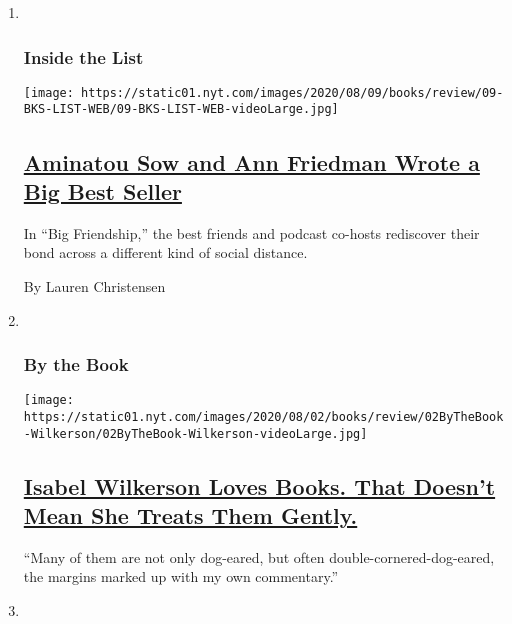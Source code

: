 \begin{enumerate}
\def\labelenumi{\arabic{enumi}.}
\item ~
  \hypertarget{inside-the-list}{%
  \subsubsection{Inside the List}\label{inside-the-list}}

  \texttt{[image: https://static01.nyt.com/images/2020/08/09/books/review/09-BKS-LIST-WEB/09-BKS-LIST-WEB-videoLarge.jpg]}

  \hypertarget{aminatou-sow-and-ann-friedman-wrote-a-big-best-seller}{%
  \subsection{\texorpdfstring{\href{/2020/07/30/books/review/aminatou-sow-ann-friedman-big-friendship.html}{Aminatou
  Sow and Ann Friedman Wrote a Big Best
  Seller}}{Aminatou Sow and Ann Friedman Wrote a Big Best Seller}}\label{aminatou-sow-and-ann-friedman-wrote-a-big-best-seller}}

  In ``Big Friendship,'' the best friends and podcast co-hosts
  rediscover their bond across a different kind of social distance.

  By Lauren Christensen
\item ~
  \hypertarget{by-the-book}{%
  \subsubsection{By the Book}\label{by-the-book}}

  \texttt{[image: https://static01.nyt.com/images/2020/08/02/books/review/02ByTheBook-Wilkerson/02ByTheBook-Wilkerson-videoLarge.jpg]}

  \hypertarget{isabel-wilkerson-loves-books-that-doesnt-mean-she-treats-them-gently}{%
  \subsection{\texorpdfstring{\href{/2020/07/30/books/review/isabel-wilkerson-by-the-book-interview.html}{Isabel
  Wilkerson Loves Books. That Doesn't Mean She Treats Them
  Gently.}}{Isabel Wilkerson Loves Books. That Doesn't Mean She Treats Them Gently.}}\label{isabel-wilkerson-loves-books-that-doesnt-mean-she-treats-them-gently}}

  ``Many of them are not only dog-eared, but often
  double-cornered-dog-eared, the margins marked up with my own
  commentary.''
\item ~
  \hypertarget{the-book-review-podcast}{%
}
\end{enumerate}
